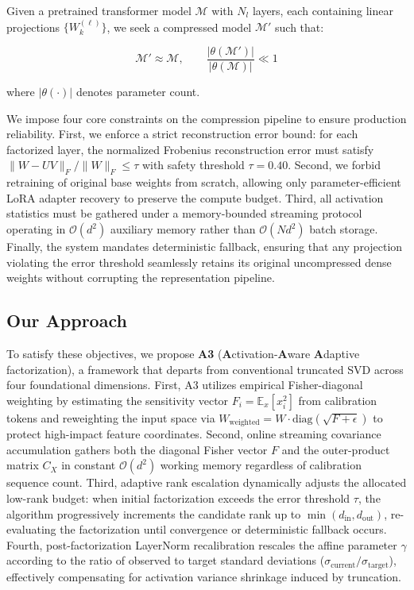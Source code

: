 Given a pretrained transformer model $\mathcal{M}$ with $N_l$ layers, each 
containing linear projections $\{W^{(\ell)}_k\}$, we seek a compressed model 
$\mathcal{M}'$ such that:

\[
\mathcal{M}' \approx \mathcal{M}, \qquad
\frac{|\theta(\mathcal{M}')|}{|\theta(\mathcal{M})|} \ll 1
\tag{1.2}
\]

where $|\theta(\cdot)|$ denotes parameter count.

We impose four core constraints on the compression pipeline to ensure production reliability. First, we enforce a strict reconstruction error bound: for each factorized layer, the normalized Frobenius reconstruction error must satisfy $\|W - UV\|_F / \|W\|_F \leq \tau$ with safety threshold $\tau = 0.40$. Second, we forbid retraining of original base weights from scratch, allowing only parameter-efficient LoRA adapter recovery to preserve the compute budget. Third, all activation statistics must be gathered under a memory-bounded streaming protocol operating in $\mathcal{O}(d^2)$ auxiliary memory rather than $\mathcal{O}(Nd^2)$ batch storage. Finally, the system mandates deterministic fallback, ensuring that any projection violating the error threshold seamlessly retains its original uncompressed dense weights without corrupting the representation pipeline.

\subsection{Our Approach}

To satisfy these objectives, we propose \textbf{A3} (\textbf{A}ctivation-\textbf{A}ware \textbf{A}daptive factorization), a framework that departs from conventional truncated SVD across four foundational dimensions. First, A3 utilizes empirical Fisher-diagonal weighting by estimating the sensitivity vector $F_i = \mathbb{E}_x[x_i^2]$ from calibration tokens and reweighting the input space via $W_\text{weighted} = W \cdot \mathrm{diag}(\sqrt{F + \epsilon})$ to protect high-impact feature coordinates. Second, online streaming covariance accumulation gathers both the diagonal Fisher vector $F$ and the outer-product matrix $C_X$ in constant $\mathcal{O}(d^2)$ working memory regardless of calibration sequence count. Third, adaptive rank escalation dynamically adjusts the allocated low-rank budget: when initial factorization exceeds the error threshold $\tau$, the algorithm progressively increments the candidate rank up to $\min(d_\text{in}, d_\text{out})$, re-evaluating the factorization until convergence or deterministic fallback occurs. Fourth, post-factorization LayerNorm recalibration rescales the affine parameter $\gamma$ according to the ratio of observed to target standard deviations ($\sigma_\text{current} / \sigma_\text{target}$), effectively compensating for activation variance shrinkage induced by truncation.
